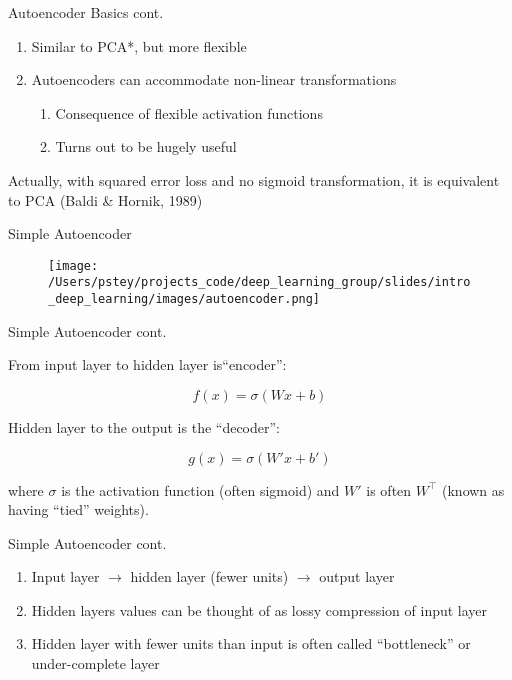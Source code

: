 \documentclass[pdf]{beamer}
\begin{document}
		\begin{frame}{Autoencoder Basics cont.}
		\begin{enumerate}
			\item Similar to PCA*, but more flexible  
			\item Autoencoders can accommodate non-linear transformations
			\begin{enumerate}[1]
				\item Consequence of flexible activation functions
				\item Turns out to be hugely useful 
			\end{enumerate}
		\end{enumerate}
		
		\vspace{8em}
		{\tiny * Actually, with squared error loss and no sigmoid transformation, it is equivalent to PCA (Baldi \& Hornik, 1989)}
		\end{frame}
		
		\begin{frame}{Simple Autoencoder}
		\begin{figure}
			\texttt{[image: /Users/pstey/projects\_code/deep\_learning\_group/slides/intro\_deep\_learning/images/autoencoder.png]}
		\end{figure}	
		\end{frame}
	
		\begin{frame}{Simple Autoencoder cont.}
		
		From input layer to hidden layer is``encoder'':
		\vspace{-1em}
		\begin{center}
		$$ f(x) = \sigma(Wx + b) $$
		\end{center}
		Hidden layer to the output is the ``decoder'':
		\vspace{-1em}
		\begin{center}
		$$ g(x) = \sigma(W'x + b') $$
		\end{center}
		where $\sigma$ is the activation function (often sigmoid) and $W'$ is often $W^\top$ (known as having ``tied'' weights).
		\end{frame}
		
		\begin{frame}{Simple Autoencoder cont.}
		\begin{enumerate}
			\item Input layer $\rightarrow$ hidden layer (fewer units) $\rightarrow$ output layer  
			\item Hidden layers values can be thought of as lossy compression of input layer
			\item Hidden layer with fewer units than input is often called ``bottleneck'' or under-complete layer

		\end{enumerate}
		\end{frame}
		
\end{document}
